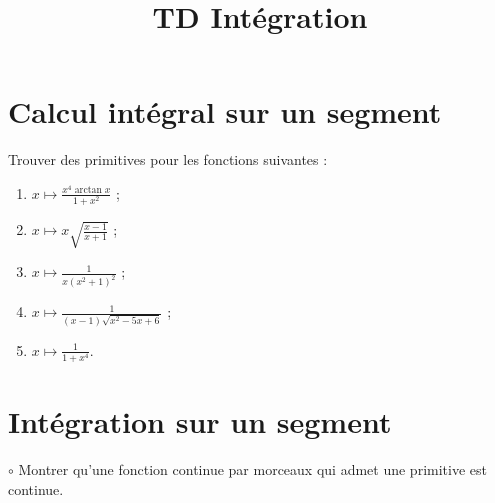 \documentclass[french,a4paper]{article}
\title{TD Intégration}
\theoremstyle{plain}
\theoremstyle{definition}
\theoremstyle{remark}
\begin{document}
\maketitle

\section{Calcul intégral sur un segment}

\begin{ex}[Moulin.IG.01]{}
	Trouver des primitives pour les fonctions suivantes :
	\begin{enumerate}
		\item $x\mapsto\displaystyle\frac{x^4\arctan x}{1+x^2}$ ;
		\item $x\mapsto\displaystyle x\sqrt{\frac{x-1}{x+1}}$ ;
		\item $x\mapsto\frac{1}{x(x^2+1)^2}$ ;
		\item $x\mapsto\displaystyle\frac{1}{(x-1)\sqrt{x^2-5x+6}}$ ;
		\item $x\mapsto\displaystyle\frac{1}{1+x^4}$.
	\end{enumerate}
\end{ex}

\section{Intégration sur un segment}

\begin{ex}[Moulin.IG.02]{$\circ$}
	Montrer qu'une fonction continue par morceaux qui admet une primitive est continue.
\end{ex}
\end{document}
